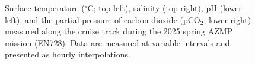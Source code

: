 \documentclass[12pt]{article}\usepackage[]{graphicx}\usepackage[]{color}
\begin{document}
\clearpage
\begin{landscape}


\begin{figure}[H]

{\centering {}    

}

\caption{Surface temperature ($^\circ$C; top left), salinity (top right), pH (lower left), and the partial pressure of carbon dioxide (pCO$_{2}$; lower right) measured along the cruise track during the 2025 spring AZMP mission (EN728). Data are measured at variable intervals and presented as hourly interpolations.  }\label{fig:figure4}
\end{figure}
\end{landscape}
\pagestyle{plain}
\end{document}
